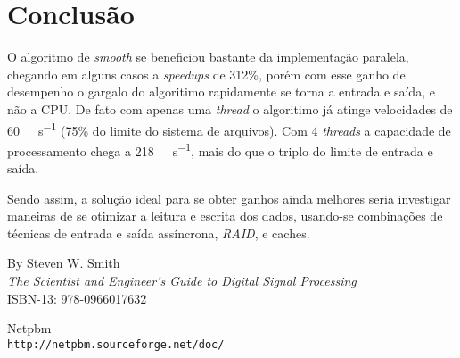 \documentclass[11pt,towside]{article}
\begin{document}
\break
\section{Conclusão}
O algoritmo de \emph{smooth} se beneficiou bastante da implementação paralela, chegando em alguns casos a \emph{speedups} de 312\%, porém com esse ganho de desempenho o gargalo do algoritimo rapidamente se torna a entrada e saída, e não a CPU. De fato com apenas uma \emph{thread} o algoritimo já atinge velocidades de \SI{60}{\mebi\byte\per\s} (75\% do limite do sistema de arquivos). Com 4 \emph{threads} a capacidade de processamento chega a \SI{218}{\mebi\byte\per\s}, mais do que o triplo do limite de entrada e saída.

Sendo assim, a solução ideal para se obter ganhos ainda melhores seria investigar maneiras de se otimizar a leitura e escrita dos dados, usando-se combinações de técnicas de entrada e saída assíncrona, \emph{RAID}, e caches.

\begin{thebibliography}{5}
By Steven W. Smith
\\\textit{The Scientist and Engineer's Guide to Digital Signal Processing}\\ISBN-13: 978-0966017632
 
Netpbm
\\\texttt{http://netpbm.sourceforge.net/doc/}
\end{thebibliography}
\end{document}
